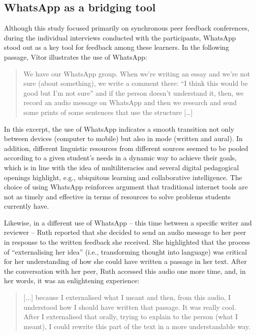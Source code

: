 \documentclass[english]{textolivre}
\begin{document}
\subsection{WhatsApp as a bridging tool}

Although this study focused primarily on synchronous peer feedback conferences, during the individual interviews conducted with the participants, WhatsApp stood out as a key tool for feedback among these learners. In the following passage, Vítor illustrates the use of WhatsApp:

\begin{quote}
    We have our WhatsApp group. When we’re writing an essay and we’re not sure (about something), we write a comment there: “I think this would be good but I’m not sure” and if the person doesn’t understand it, then, we record an audio message on WhatsApp and then we research and send some prints of some sentences that use the structure […]
\end{quote}

In this excerpt, the use of WhatsApp indicates a smooth transition not only between devices (computer to mobile) but also in mode (written and aural). In addition, different linguistic resources from different sources seemed to be pooled according to a given student’s needs in a dynamic way to achieve their goals, which is in line with the idea of multiliteracies and several digital pedagogical openings \textcite{cope2013towards} highlight, e.g., ubiquitous learning and collaborative intelligence. The choice of using WhatsApp reinforces \textcite{chandra2021online} argument that traditional internet tools are not as timely and effective in terms of resources to solve problems students currently have.

Likewise, in a different use of WhatsApp – this time between a specific writer and reviewer – Ruth reported that she decided to send an audio message to her peer in response to the written feedback she received. She highlighted that the process of “externalising her idea” (i.e., transforming thought into language) was critical for her understanding of how she could have written a passage in her text. After the conversation with her peer, Ruth accessed this audio one more time, and, in her words, it was an enlightening experience:

\begin{quote}
    [...] because I externalised what I meant and then, from this audio, I understood how I should have written that passage. It was really cool. After I externalised that orally, trying to explain to the person (what I meant), I could rewrite this part of the text in a more understandable way.
\end{quote}
\end{document}
